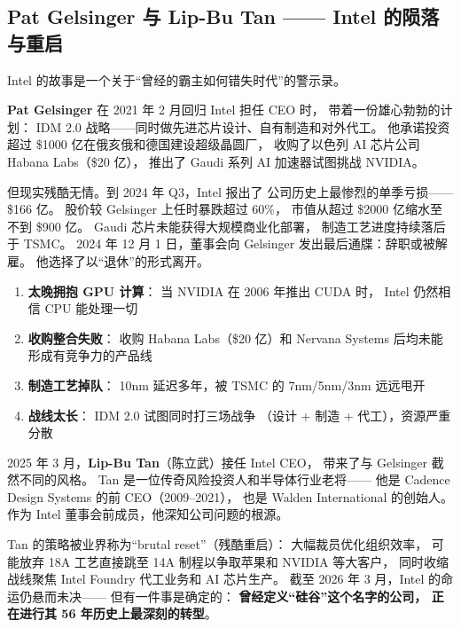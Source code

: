 \subsection{Pat Gelsinger 与 Lip-Bu Tan —— Intel 的陨落与重启}
\label{subsec:intel}

Intel 的故事是一个关于``曾经的霸主如何错失时代''的警示录。

\textbf{Pat Gelsinger} 在 2021 年 2 月回归 Intel 担任 CEO 时，
带着一份雄心勃勃的计划：
IDM 2.0 战略——同时做先进芯片设计、自有制造和对外代工。
他承诺投资超过 \$1000 亿在俄亥俄和德国建设超级晶圆厂，
收购了以色列 AI 芯片公司 Habana Labs（\$20 亿），
推出了 Gaudi 系列 AI 加速器试图挑战 NVIDIA。

但现实残酷无情。到 2024 年 Q3，Intel 报出了
公司历史上最惨烈的单季亏损——\$166 亿。
股价较 Gelsinger 上任时暴跌超过 60\%，
市值从超过 \$2000 亿缩水至不到 \$900 亿。
Gaudi 芯片未能获得大规模商业化部署，
制造工艺进度持续落后于 TSMC。
2024 年 12 月 1 日，董事会向 Gelsinger 发出最后通牒：辞职或被解雇。
他选择了以``退休''的形式离开。

\begin{warnbox}
\begin{enumerate}[noitemsep]
  \item \textbf{太晚拥抱 GPU 计算}：
        当 NVIDIA 在 2006 年推出 CUDA 时，
        Intel 仍然相信 CPU 能处理一切
  \item \textbf{收购整合失败}：
        收购 Habana Labs（\$20 亿）和 Nervana Systems
        后均未能形成有竞争力的产品线
  \item \textbf{制造工艺掉队}：
        10nm 延迟多年，被 TSMC 的 7nm/5nm/3nm 远远甩开
  \item \textbf{战线太长}：
        IDM 2.0 试图同时打三场战争
        （设计 + 制造 + 代工），资源严重分散
\end{enumerate}
\end{warnbox}

2025 年 3 月，\textbf{Lip-Bu Tan}（陈立武）接任 Intel CEO，
带来了与 Gelsinger 截然不同的风格。
Tan 是一位传奇风险投资人和半导体行业老将——
他是 Cadence Design Systems 的前 CEO（2009--2021），
也是 Walden International 的创始人。
作为 Intel 董事会前成员，他深知公司问题的根源。

Tan 的策略被业界称为``brutal reset''（残酷重启）：
大幅裁员优化组织效率，
可能放弃 18A 工艺直接跳至 14A 制程以争取苹果和 NVIDIA 等大客户，
同时收缩战线聚焦 Intel Foundry 代工业务和 AI 芯片生产。
截至 2026 年 3 月，Intel 的命运仍悬而未决——
但有一件事是确定的：
\textbf{曾经定义``硅谷''这个名字的公司，
正在进行其 56 年历史上最深刻的转型}。


